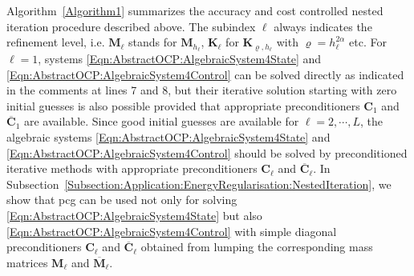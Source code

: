 \documentclass{article}
\numberwithin{equation}{section}
\begin{document}
Algorithm~\ref{Algorithm1} summarizes the accuracy and cost controlled
nested iteration procedure described above. The subindex $\ell$ always
indicates the refinement level, i.e. ${\mathbf M}_\ell$ stands for
${\mathbf M}_{h_\ell}$, ${\mathbf K}_\ell$ for ${\mathbf K}_{\varrho,h_\ell}$
with $\varrho=h_\ell^{2\alpha}$ etc. For $\ell = 1$, systems
\eqref{Eqn:AbstractOCP:AlgebraicSystem4State} and
\eqref{Eqn:AbstractOCP:AlgebraicSystem4Control} can be solved directly 
as indicated in the comments at lines 7 and 8, but their iterative solution 
starting with zero initial guesses is also possible provided that appropriate
preconditioners ${\mathbf C}_1$ and $\overline{\mathbf C}_1$ are available.
Since good initial guesses are available for $\ell = 2,\cdots,L$, the
algebraic systems \eqref{Eqn:AbstractOCP:AlgebraicSystem4State} and
\eqref{Eqn:AbstractOCP:AlgebraicSystem4Control} should be solved by
preconditioned iterative methods with appropriate
preconditioners ${\mathbf C}_\ell$ and $\overline{\mathbf C}_\ell$.
In Subsection~\ref{Subsection:Application:EnergyRegularisation:NestedIteration},
we show that pcg can be used not only for solving
\eqref{Eqn:AbstractOCP:AlgebraicSystem4State} but also
\eqref{Eqn:AbstractOCP:AlgebraicSystem4Control} with simple diagonal 
preconditioners ${\mathbf C}_\ell$ and $\overline{\mathbf C}_\ell$ 
obtained from lumping the corresponding mass matrices 
${\mathbf M}_\ell$ and $\overline{\mathbf M}_\ell$. 
\end{document}
